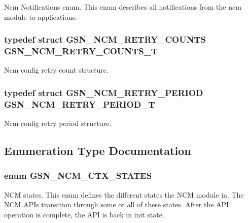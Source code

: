 Ncm Notifications enum. This enum describes all notifications from the ncm module to applications. 

\hypertarget{a00688_gab0e77b5fbb8b18c829e3cd9170252340}{
\subsubsection[{GSN\_\-NCM\_\-RETRY\_\-COUNTS\_\-T}]{\setlength{\rightskip}{0pt plus 5cm}typedef struct {\bf GSN\_\-NCM\_\-RETRY\_\-COUNTS} {\bf GSN\_\-NCM\_\-RETRY\_\-COUNTS\_\-T}}}
\label{a00688_gab0e77b5fbb8b18c829e3cd9170252340}


Ncm config retry count structure. 

\hypertarget{a00688_ga85c994a3952734087a59e5157a99d8c5}{
\subsubsection[{GSN\_\-NCM\_\-RETRY\_\-PERIOD\_\-T}]{\setlength{\rightskip}{0pt plus 5cm}typedef struct {\bf GSN\_\-NCM\_\-RETRY\_\-PERIOD} {\bf GSN\_\-NCM\_\-RETRY\_\-PERIOD\_\-T}}}
\label{a00688_ga85c994a3952734087a59e5157a99d8c5}


Ncm config retry period structure. 



\subsection{Enumeration Type Documentation}
\hypertarget{a00688_ga950af3c458482d4fbf1838aaf8b30f2d}{
\subsubsection[{GSN\_\-NCM\_\-CTX\_\-STATES}]{\setlength{\rightskip}{0pt plus 5cm}enum {\bf GSN\_\-NCM\_\-CTX\_\-STATES}}}
\label{a00688_ga950af3c458482d4fbf1838aaf8b30f2d}


NCM states. This enum defines the different states the NCM module in. The NCM APIs transition through some or all of these states. After the API operation is complete, the API is back in init state. 

